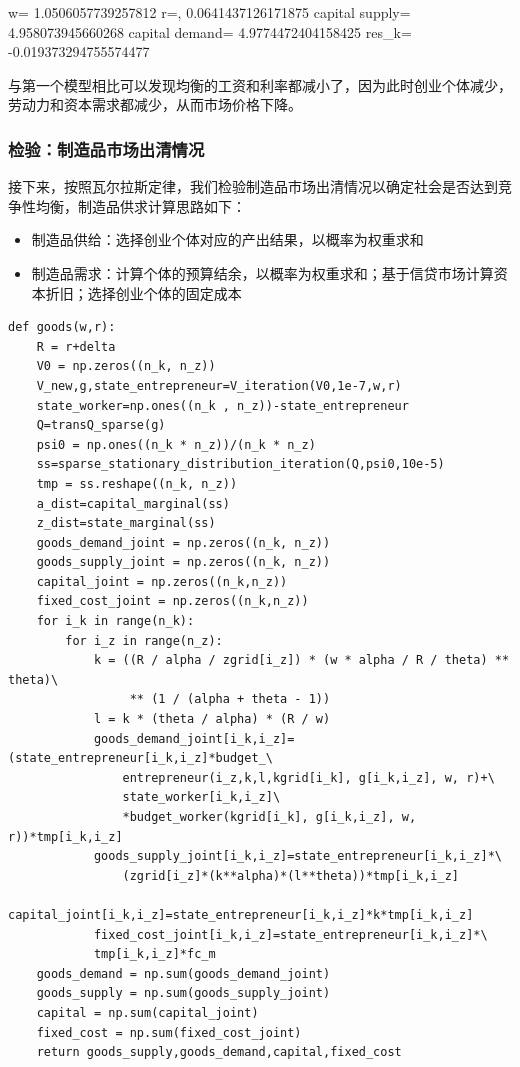 \documentclass[a4paper, 12pt]{ctexart}
\begin{document}
w= 1.0506057739257812 r=, 0.0641437126171875 capital supply= 4.958073945660268 capital demand= 4.9774472404158425 res\_k= -0.019373294755574477

与第一个模型相比可以发现均衡的工资和利率都减小了，因为此时创业个体减少，劳动力和资本需求都减少，从而市场价格下降。
\subsubsection{检验：制造品市场出清情况}
接下来，按照瓦尔拉斯定律，我们检验制造品市场出清情况以确定社会是否达到竞争性均衡，制造品供求计算思路如下：
\begin{itemize}
    \item 制造品供给：选择创业个体对应的产出结果，以概率为权重求和
    \item 制造品需求：计算个体的预算结余，以概率为权重求和；基于信贷市场计算资本折旧；选择创业个体的固定成本
\end{itemize}
\begin{lstlisting}
def goods(w,r):
    R = r+delta
    V0 = np.zeros((n_k, n_z))
    V_new,g,state_entrepreneur=V_iteration(V0,1e-7,w,r)
    state_worker=np.ones((n_k , n_z))-state_entrepreneur
    Q=transQ_sparse(g)
    psi0 = np.ones((n_k * n_z))/(n_k * n_z)
    ss=sparse_stationary_distribution_iteration(Q,psi0,10e-5)
    tmp = ss.reshape((n_k, n_z))
    a_dist=capital_marginal(ss)
    z_dist=state_marginal(ss)
    goods_demand_joint = np.zeros((n_k, n_z))
    goods_supply_joint = np.zeros((n_k, n_z))
    capital_joint = np.zeros((n_k,n_z))        
    fixed_cost_joint = np.zeros((n_k,n_z))      
    for i_k in range(n_k):
        for i_z in range(n_z):
            k = ((R / alpha / zgrid[i_z]) * (w * alpha / R / theta) ** theta)\
                 ** (1 / (alpha + theta - 1))
            l = k * (theta / alpha) * (R / w)
            goods_demand_joint[i_k,i_z]=(state_entrepreneur[i_k,i_z]*budget_\
                entrepreneur(i_z,k,l,kgrid[i_k], g[i_k,i_z], w, r)+\
                state_worker[i_k,i_z]\
                *budget_worker(kgrid[i_k], g[i_k,i_z], w, r))*tmp[i_k,i_z]
            goods_supply_joint[i_k,i_z]=state_entrepreneur[i_k,i_z]*\
                (zgrid[i_z]*(k**alpha)*(l**theta))*tmp[i_k,i_z]
            capital_joint[i_k,i_z]=state_entrepreneur[i_k,i_z]*k*tmp[i_k,i_z]
            fixed_cost_joint[i_k,i_z]=state_entrepreneur[i_k,i_z]*\
            tmp[i_k,i_z]*fc_m
    goods_demand = np.sum(goods_demand_joint)
    goods_supply = np.sum(goods_supply_joint)
    capital = np.sum(capital_joint)
    fixed_cost = np.sum(fixed_cost_joint)
    return goods_supply,goods_demand,capital,fixed_cost
\end{lstlisting}
\end{document}
